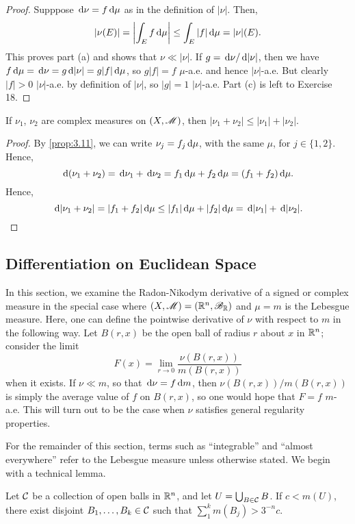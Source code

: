 \documentclass[12pt]{article} %
\begin{document}
\begin{proof}
    Supppose $\, \mathrm{d}\nu = f\, \mathrm{d}\mu$ as in the definition of $|\nu|$. Then, \[|\nu(E)| = \left|\int_E f \, \mathrm{d}\mu \right| \leq \int_E |f| \, \mathrm{d}\mu = |\nu|(E).\] This proves part (a) and shows that $\nu \ll |\nu|$. If $g = \, \mathrm{d}\nu / \, \mathrm{d}|\nu|$, then we have $f \, \mathrm{d}\mu = \, \mathrm{d}\nu = g \, \mathrm{d}|\nu| = g |f| \, \mathrm{d}\mu$, so $g|f| = f$ $\mu$-a.e. and hence $|\nu|$-a.e. But clearly $|f| > 0$ $|\nu|$-a.e. by definition of $|\nu|$, so $|g| = 1$ $|\nu|$-a.e. Part (c) is left to Exercise 18.
\end{proof}

\begin{proposition}
    If $\nu_1$, $\nu_2$ are complex measures on $(X, \mathscr{M})$, then $|\nu_1 + \nu_2| \leq |\nu_1| + |\nu_2|$.
\end{proposition}

\begin{proof}
    By \cref{prop:3.11}, we can write $\nu_j = f_j \, \mathrm{d}\mu$, with the same $\mu$, for $j \in \{1, 2\}$. Hence, \[\, \mathrm{d}(\nu_1 + \nu_2) = \, \mathrm{d} \nu_1 + \, \mathrm{d}\nu_2 = f_1\, \mathrm{d}\mu + f_2\, \mathrm{d}\mu = (f_1 + f_2)\, \mathrm{d}\mu.\] Hence, \[\, \mathrm{d}|\nu_1 + \nu_2| = |f_1 + f_2|\, \mathrm{d}\mu \leq |f_1|\, \mathrm{d}\mu + |f_2|\, \mathrm{d}\mu = \, \mathrm{d}|\nu_1| + \, \mathrm{d}|\nu_2|.\]
\end{proof}

\subsection{Differentiation on Euclidean Space}

In this section, we examine the Radon-Nikodym derivative of a signed or complex measure in the special case where $(X, \mathscr{M}) = (\mathbb{R}^n, \mathscr{B}_{\mathbb{R}})$ and $\mu = m$ is the Lebesgue measure. Here, one can define the pointwise derivative of $\nu$ with respect to $m$ in the following way. Let $B(r, x)$ be the open ball of radius $r$ about $x$ in $\mathbb{R}^n$; consider the limit \[F(x) = \lim_{r \to 0} \frac{\nu(B(r, x))}{m(B(r,x))}\] when it exists. If $\nu \ll m$, so that $\, \mathrm{d}\nu = f\, \mathrm{d} m$, then $\nu(B(r, x))/m(B(r, x))$ is simply the average value of $f$ on $B(r, x)$, so one would hope that $F = f$ $m$-a.e. This will turn out to be the case when $\nu$ satisfies general regularity properties.

For the remainder of this section, terms such as ``integrable'' and ``almost everywhere'' refer to the Lebesgue measure unless otherwise stated. We begin with a technical lemma.

\begin{lemma}\label{lem:vitali-covering}
    Let $\mathcal{C}$ be a collection of open balls in $\mathbb{R}^n$, and let $U = \bigcup_{B \in \mathcal{C}} B$. If $c < m(U)$, there exist disjoint $B_1, \ldots, B_k \in \mathcal{C}$ such that $\sum_1^k m(B_j) > 3^{-n}c$.
\end{lemma}
\end{document}
